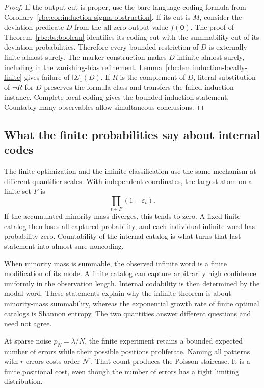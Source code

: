 \documentclass[11pt]{article}
\numberwithin{equation}{section}
\theoremstyle{definition}
\theoremstyle{remark}
\begin{document}
\begin{proof}
If the output cut is proper, use the bare-language coding formula from
Corollary~\ref{rbc:cor:induction-sigma-obstruction}. If its cut is $M$, consider
the deviation predicate $D$ from the all-zero output value $f(\mathbf0)$.
The proof of Theorem~\ref{rbc:bs:boolean} identifies its coding cut with the
summability cut of its deviation probabilities. Therefore every bounded
restriction of $D$ is externally finite almost surely. The marker
construction makes $D$ infinite almost surely, including in the
vanishing-bias refinement. Lemma~\ref{rbc:lem:induction-locally-finite} gives
failure of $\mathsf I\Sigma_1(D)$. If $R$ is the complement of $D$, literal
substitution of $\neg R$ for $D$ preserves the formula class and transfers
the failed induction instance. Complete local coding gives the bounded
induction statement. Countably many observables allow simultaneous
conclusions.
\end{proof}

\subsection{What the finite probabilities say about internal codes}

The finite optimization and the infinite classification use the same
mechanism at different quantifier scales. With independent coordinates,
the largest atom on a finite set $F$ is
\[
 \prod_{t\in F}(1-\varepsilon_t).
\]
If the accumulated minority mass diverges, this tends to zero. A fixed
finite catalog then loses all captured probability, and each individual
infinite word has probability zero. Countability of the internal catalog
is what turns that last statement into almost-sure noncoding.

When minority mass is summable, the observed infinite word is a finite
modification of its mode. A finite catalog can capture arbitrarily high
confidence uniformly in the observation length. Internal codability is
then determined by the modal word. These statements explain why the
infinite theorem is about minority-mass summability, whereas the
exponential growth rate of finite optimal catalogs is Shannon entropy.
The two quantities answer different questions and need not agree.

At sparse noise $p_N=\lambda/N$, the finite experiment retains a bounded
expected number of errors while their possible positions proliferate.
Naming all patterns with $r$ errors costs order $N^r$. That count produces
the Poisson staircase. It is a finite positional cost, even though the
number of errors has a tight limiting distribution.
\end{document}
